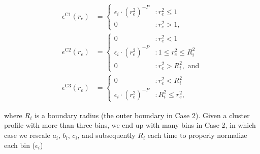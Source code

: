 \documentclass[onecolumn,traditabstract]{aa}
\begin{document}
\begin{align}
  \epsilon^{\text{C1}}(r_e) &= \begin{cases}
    \epsilon_i \cdot (r_e^2)^{-P} &: r_e^2 \leq 1 \\
                        0 &: r_e^2 > 1,
    \end{cases}
  \label{eqn:case1_shell} \\
  \epsilon^{\text{C2}}(r_e) &= \begin{cases}
                         0 &: r_e^2 < 1 \\
    \epsilon_i \cdot (r_e^2)^{-P} &: 1 \leq r_e^2 \leq R_i^2 \\
                         0 &: r_e^2 > R_i^2, \text{ and}
    \end{cases}
  \label{eqn:case2_shell} \\
  \epsilon^{\text{C3}}(r_e) &= \begin{cases}
                        0 &: r_e^2 < R_i^2 \\
    \epsilon_i \cdot (r_e^2)^{-P} &: R_i^2 \leq r_e^2, 
    \end{cases}
  \label{eqn:case3_shell} 
\end{align}

where $R_i$ is a boundary radius (the outer boundary in Case 2). Given a cluster profile with more than three bins, we end
up with many bins in Case 2, in which case we rescale $a_i$, $b_i$, $c_i$, and subsequently $R_i$ each time to properly
normalize each bin ($\epsilon_i$)
\end{document}
